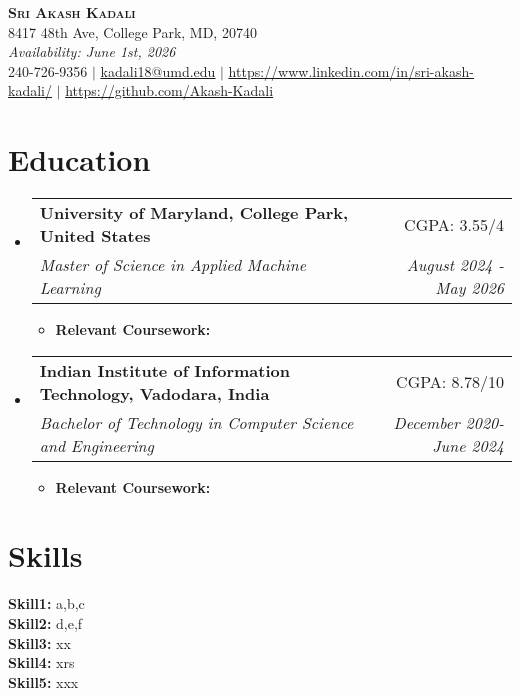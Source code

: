 \documentclass[letterpaper,11pt]{article}
\makeatletter
\newcommand{\resumeSubheading}[4]{
  \vspace{-2pt}\item
    \begin{tabular*}{0.97\textwidth}[t]{l@{\extracolsep{\fill}}r}
      \textbf{#1} & #2 \\
      \textit{\small#3} & \textit{\small #4} \\
    \end{tabular*}\vspace{-7pt}
}
\newcommand{\resumeSubHeadingListStart}{\begin{itemize}[leftmargin=0.15in, label={}]}
\newcommand{\resumeSubHeadingListEnd}{\end{itemize}}
\newcommand{\resumeItemListStart}{\begin{itemize}}
\newcommand{\resumeItemListEnd}{\end{itemize}\vspace{-5pt}}
\makeatother
\begin{document}
\begin{center}
    \textbf{\Huge \scshape Sri Akash Kadali} \\ \vspace{1pt}
    8417 48th Ave, College Park, MD, 20740 \\ \vspace{1pt}
     \textit{Availability: June 1st, 2026} \\ \vspace{1pt}
    \small 240-726-9356 $|$ \href{mailto:kadali18@umd.edu}{\underline{kadali18@umd.edu}} $|$ 
    \href{https://www.linkedin.com/in/sri-akash-kadali/}{\underline{https://www.linkedin.com/in/sri-akash-kadali/}} $|$
    \href{https://github.com/Akash-Kadali}{\underline{https://github.com/Akash-Kadali}}
\end{center}

\section{Education}
\resumeSubHeadingListStart
   \resumeSubheading
      {University of Maryland, College Park, United States \scriptsize{} }{CGPA: 3.55/4}
      {Master of Science in Applied Machine Learning}{August 2024 - May 2026}
      \resumeItemListStart
      \item \textbf{Relevant Coursework:}
      \resumeItemListEnd

      \resumeSubheading
      {Indian Institute of Information Technology, Vadodara, India \scriptsize{} }{CGPA: 8.78/10}
      {Bachelor of Technology in Computer Science and Engineering}{December 2020- June 2024}
      \resumeItemListStart
      \item \textbf{Relevant Coursework:}
\resumeItemListEnd
  \resumeSubHeadingListEnd

\section{Skills}
 \begin{itemize}[leftmargin=0.15in, label={}]
    \small{\item{
\textbf{Skill1:} a,b,c\\
\textbf{Skill2:}  d,e,f\\
\textbf{Skill3:} xx\\
\textbf{Skill4:}  xrs\\
\textbf{Skill5:} xxx\\
    }}
 \end{itemize}
\end{document}
